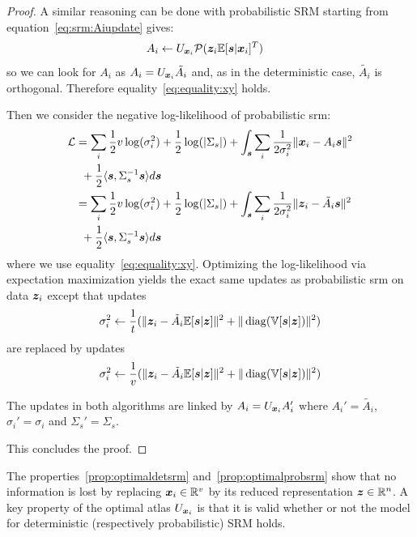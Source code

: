 \begin{proof}
  A similar reasoning can be done with probabilistic SRM starting from
  equation~\eqref{eq:srm:Aiupdate} gives:
  \begin{align}
    A_i &\leftarrow U_{\boldsymbol{x}_i}\mathcal{P}(\boldsymbol{z}_i \mathbb{E}[\boldsymbol{s}| \boldsymbol{x}_i]^T)
  \end{align}
  so we can look for $A_i$ as $A_i = U_{\boldsymbol{x}_i} \tilde{A_i}$ and, as in the
  deterministic case, $\tilde{A_i}$ is orthogonal.
  Therefore equality~\eqref{eq:equality:xy} holds.
  
  Then we consider the negative log-likelihood of probabilistic srm:
  \begin{align}
    \mathcal{L} &= \sum_i \frac12 v\log(\sigma_i^2) + \frac12 \log(|\Sigma_s|) + \int_{\boldsymbol{s}} \sum_i \frac1{2 \sigma_i^{2}}\|\boldsymbol{x}_i - A_i \boldsymbol{s} \|^2 \\& \enspace + \frac12 \langle \boldsymbol{s} , \Sigma_s^{-1} \boldsymbol{s} \rangle  d\boldsymbol{s} \\
          &= \sum_i \frac12 v \log(\sigma_i^2) + \frac12 \log(|\Sigma_s|) + \int_{\boldsymbol{s}} \sum_i \frac1{2 \sigma_i^{2}}\|\boldsymbol{z}_i - \tilde{A_i} \boldsymbol{s} \|^2 \\& \enspace+ \frac12 \langle \boldsymbol{s} , \Sigma_s^{-1} \boldsymbol{s} \rangle  d\boldsymbol{s}
  \end{align}
  where we use equality~\eqref{eq:equality:xy}.
  Optimizing the log-likelihood via expectation maximization yields the exact
  same updates as probabilistic srm on data $\boldsymbol{z}_i$
  except that updates
  \begin{align}
    \sigma_i^2 \leftarrow \frac1{t} (\| \boldsymbol{z}_i - \tilde{A_i} \mathbb{E}[\boldsymbol{s}|\boldsymbol{z}]\|^2 + \| \operatorname*{diag}(\mathbb{V}[\boldsymbol{s} | \boldsymbol{z}]) \|^2)
  \end{align}
  are replaced by updates
  \begin{align}
    \sigma_i^2 \leftarrow \frac1{v} (\| \boldsymbol{z}_i - \tilde{A_i} \mathbb{E}[\boldsymbol{s}|\boldsymbol{z}]\|^2 + \| \operatorname*{diag}(\mathbb{V}[\boldsymbol{s} | \boldsymbol{z}]) \|^2)
  \end{align}

  The updates in both algorithms are linked  by $A_i = U_{\boldsymbol{x}_i}A_i'$ where
  $A_i' = \tilde{A_i}$, $\sigma_i' =
  \sigma_i$ and $\Sigma_s'  = \Sigma_s$.

  This concludes the proof.
\end{proof}

The properties~\ref{prop:optimaldetsrm} and~\ref{prop:optimalprobsrm} show that
no information is lost by replacing $\boldsymbol{x}_i \in \mathbb{R}^v$ by its reduced representation $\boldsymbol{z} \in \mathbb{R}^n$.
A key property of the optimal atlas $U_{\boldsymbol{x}_i}$ is that it is valid whether or
not the model for deterministic (respectively probabilistic) SRM holds.

